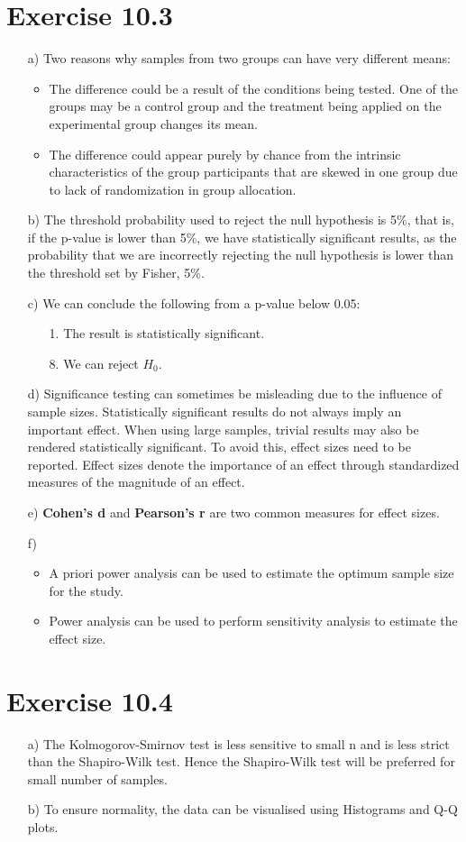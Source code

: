 \documentclass[a4paper]{article}
\begin{document}
\section*{Exercise 10.3}
\begin{enumerate}
	\item[a)] Two reasons why samples from two groups can have very different means:
	\begin{itemize}
		\item The difference could be a result of the conditions being tested. One of the groups may be a control group and the treatment being applied on the experimental group changes its mean.
		\item The difference could appear purely by chance from the intrinsic characteristics of the group participants that are skewed in one group due to lack of randomization in group allocation.
	\end{itemize}
	\item[b)] The threshold probability used to reject the null hypothesis is 5\%, that is, if the p-value is lower than 5\%, we have statistically significant results, as the probability that we are incorrectly rejecting the null hypothesis is lower than the threshold set by Fisher, 5\%.
	\item[c)] We can conclude the following from a p-value below 0.05:
	\begin{enumerate}
		\item[1.] The result is statistically significant.
		\item[8.] We can reject $H_0$.
	\end{enumerate}
\item[d)] Significance testing can sometimes be misleading due to the influence of sample sizes. Statistically significant results do not always imply an important effect. When using large samples, trivial results may also be rendered statistically significant. To avoid this, effect sizes need to be reported. Effect sizes denote the importance of an effect through standardized measures of the magnitude of an effect. 
\item[e)] \textbf{Cohen's d} and \textbf{Pearson's r} are two common measures for effect sizes.
\item[f)] \begin{itemize}
	\item A priori power analysis can be used to estimate the optimum sample size for the study.
	\item Power analysis can be used to perform sensitivity analysis to estimate the effect size.
\end{itemize}
\end{enumerate}
\section*{Exercise 10.4}
\begin{enumerate}
	\item[a)] The Kolmogorov-Smirnov test is less sensitive to small n and is less strict than the Shapiro-Wilk test. Hence the Shapiro-Wilk test will be preferred for small number of samples.
	\item[b)] To ensure normality, the data can be visualised using Histograms and Q-Q plots. 
\end{enumerate}
\end{document}

